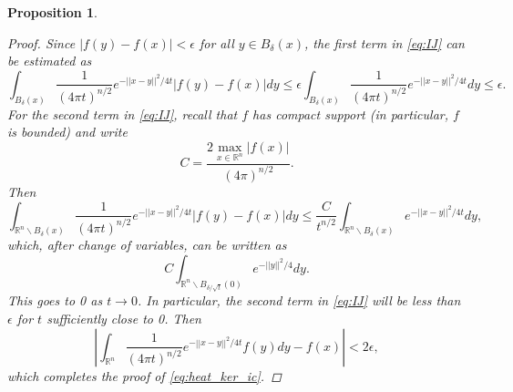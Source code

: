 \documentclass{amsart}
\newtheorem{proposition}[theorem]{Proposition}
\theoremstyle{definition}
\newcommand*{\R}{\mathbb{R}}
\begin{document}
\begin{proposition}
\begin{proof}
    Since $|f(y) - f(x)| < \epsilon$ for all $y \in B_\delta(x)$, the first term in \eqref{eq:IJ} can be estimated as
    \begin{equation*}
        \int_{B_\delta(x)} \frac{1}{(4\pi t)^{n/2}}e^{-||x-y||^2/4t}|f(y)-f(x)| dy \leq \epsilon\int_{B_\delta(x)} \frac{1}{(4\pi t)^{n/2}}e^{-||x-y||^2/4t} dy \leq \epsilon.
    \end{equation*}
    For the second term in \eqref{eq:IJ}, recall that $f$ has compact support (in particular, $f$ is bounded) and write
    \begin{equation*}
        C = \frac{2\max_{x \in \R^n}|f(x)|}{(4\pi)^{n/2}}.
    \end{equation*}
    Then
    \begin{equation*}
        \int_{\R^n \backslash B_\delta(x)} \frac{1}{(4\pi t)^{n/2}}e^{-||x-y||^2/4t}|f(y)-f(x)| dy \leq \frac{C}{t^{n/2}} \int_{\R^n \backslash B_\delta(x)} e^{-||x-y||^2/4t} dy,
    \end{equation*}
    which, after change of variables, can be written as
    \begin{equation*}
        C\int_{\R^n \backslash B_{\delta/\sqrt{t}}(0)} e^{-||y||^2/4} dy.
    \end{equation*}
    This goes to 0 as $t \to 0$. In particular, the second term in \eqref{eq:IJ} will be less than $\epsilon$ for $t$ sufficiently close to 0. Then
    \begin{equation*}
        \left|\int_{\R^n} \frac{1}{(4\pi t)^{n/2}}e^{-||x-y||^2/4t} f(y) dy - f(x) \right| < 2\epsilon,
    \end{equation*}
    which completes the proof of \eqref{eq:heat_ker_ic}.  
    

\end{proof}
\end{proposition}
\end{document}
